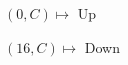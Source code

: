 \documentclass[preview]{standalone}
\begin{document}
\begin{center}
$(0,C) \mapsto$ Up

$(16,C) \mapsto$ Down
\end{center}
\end{document}
